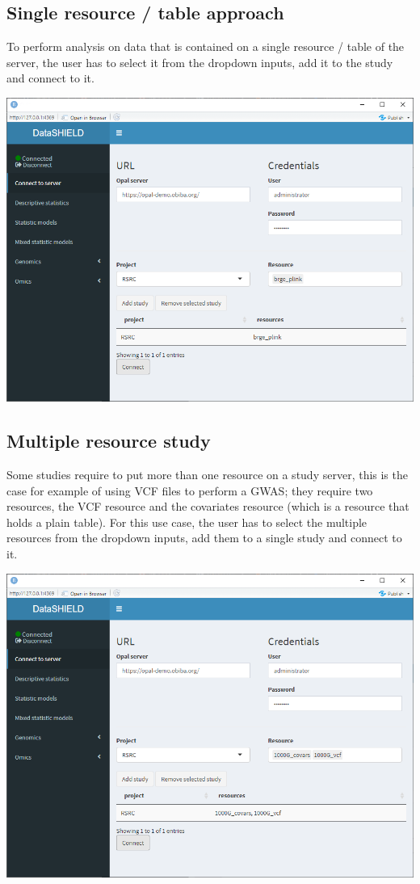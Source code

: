 \documentclass[
]{book}
\begin{document}
\hypertarget{single-resource-table-approach}{%
\subsection{Single resource / table approach}\label{single-resource-table-approach}}

To perform analysis on data that is contained on a single resource / table of the server, the user has to select it from the dropdown inputs, add it to the study and connect to it.

\includegraphics{images/data_entry1.png}

\hypertarget{multiple-resource-study}{%
\subsection{Multiple resource study}\label{multiple-resource-study}}

Some studies require to put more than one resource on a study server, this is the case for example of using VCF files to perform a GWAS; they require two resources, the VCF resource and the covariates resource (which is a resource that holds a plain table). For this use case, the user has to select the multiple resources from the dropdown inputs, add them to a single study and connect to it.

\includegraphics{images/data_entry2.png}
\end{document}
